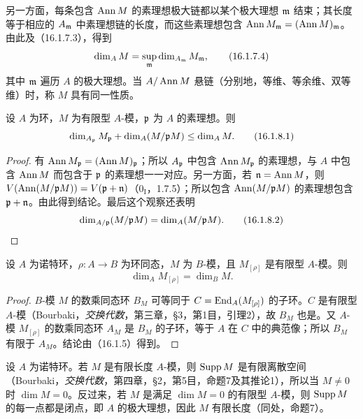 另一方面，每条包含 $\operatorname{Ann} M$ 的素理想极大链都以某个极大理想 $\mathfrak m$ 结束；其长度等于相应的 $A_{\mathfrak m}$ 中素理想链的长度，而这些素理想包含
$\operatorname{Ann} M_{\mathfrak m}=(\operatorname{Ann} M)_{\mathfrak m}$。由此及（16.1.7.3），得到
\begin{equation}
 \dim_A M=\sup_{\mathfrak m}\dim_{A_{\mathfrak m}}M_{\mathfrak m},
 \tag{16.1.7.4}
\end{equation}
其中 $\mathfrak m$ 遍历 $A$ 的极大理想。当 $A/\operatorname{Ann} M$ 悬链（分别地，等维、等余维、双等维）时，称 $M$ 具有同一性质。

设 $A$ 为环，$M$ 为有限型 $A$-模，$\mathfrak p$ 为 $A$ 的素理想。则
\begin{equation}
 \dim_{A_{\mathfrak p}}M_{\mathfrak p}+\dim_A(M/\mathfrak p M)\leq\dim_A M.
 \tag{16.1.8.1}
\end{equation}
\begin{proof}
有 $\operatorname{Ann} M_{\mathfrak p}=(\operatorname{Ann} M)_{\mathfrak p}$；所以 $A_{\mathfrak p}$ 中包含 $\operatorname{Ann} M_{\mathfrak p}$ 的素理想，与 $A$ 中包含 $\operatorname{Ann} M$ 而包含于 $\mathfrak p$ 的素理想一一对应。另一方面，若 $\mathfrak n=\operatorname{Ann} M$，则
$V(\operatorname{Ann}(M/\mathfrak p M))=V(\mathfrak p+\mathfrak n)$（$0_{\mathrm I}$，1.7.5）；所以包含 $\operatorname{Ann}(M/\mathfrak p M)$ 的素理想包含 $\mathfrak p+\mathfrak n$。由此得到结论。最后这个观察还表明
\begin{equation}
 \dim_{A/\mathfrak p}(M/\mathfrak p M)=\dim_A(M/\mathfrak p M).
 \tag{16.1.8.2}
\end{equation}
\end{proof}

设 $A$ 为诺特环，$\rho:A\to B$ 为环同态，$M$ 为 $B$-模，且 $M_{[\rho]}$ 是有限型 $A$-模。则
\begin{equation}
 \dim_A M_{[\rho]}=\dim_B M.
 \tag{16.1.9.1}
\end{equation}
\begin{proof}
$B$-模 $M$ 的数乘同态环 $B_M$ 可等同于 $C=\operatorname{End}_A(M_{[\rho]})$ 的子环。$C$ 是有限型 $A$-模（Bourbaki，\textit{交换代数}，第三章，§3，第1目，引理2），故 $B_M$ 也是。又 $A$-模 $M_{[\rho]}$ 的数乘同态环 $A_M$ 是 $B_M$ 的子环，等于 $A$ 在 $C$ 中的典范像；所以 $B_M$ 有限于 $A_M$。结论由（16.1.5）得到。
\end{proof}

设 $A$ 为诺特环。若 $M$ 是有限长度 $A$-模，则 $\operatorname{Supp} M$ 是有限离散空间（Bourbaki，\textit{交换代数}，第四章，§2，第5目，命题7及其推论1），所以当 $M\ne0$ 时 $\dim M=0$。反过来，若 $M$ 是满足 $\dim M=0$ 的有限型 $A$-模，则 $\operatorname{Supp} M$ 的每一点都是闭点，即 $A$ 的极大理想，因此 $M$ 有限长度（同处，命题7）。

